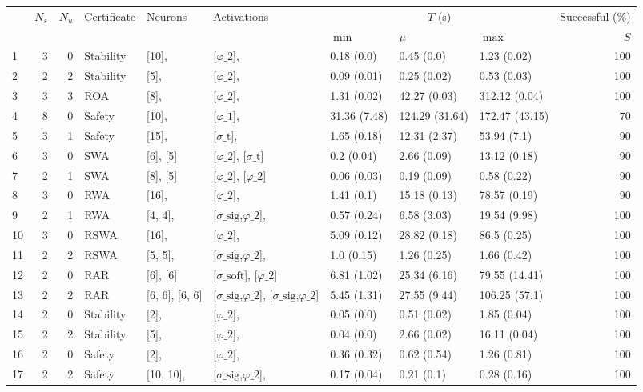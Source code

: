 \begin{tabular}{lrrllllllr}
\toprule
 & $N_s$ & $N_u$ & Certificate & Neurons & Activations & \multicolumn{3}{c}{$T$ (s)} & Successful (\%) \\
 &  &  &  &  &  & $\min$ & $\mu$ & $\max$ & $S$ \\
\midrule
1 & 3 & 0 & Stability & [10],  & [$\varphi\_{2}$],  & 0.18 (0.0) & 0.45 (0.0) & 1.23 (0.02) & 100 \\
2 & 2 & 2 & Stability & [5],  & [$\varphi\_{2}$],  & 0.09 (0.01) & 0.25 (0.02) & 0.53 (0.03) & 100 \\
3 & 3 & 3 & ROA & [8],  & [$\varphi\_{2}$],  & 1.31 (0.02) & 42.27 (0.03) & 312.12 (0.04) & 100 \\
4 & 8 & 0 & Safety & [10],  & [$\varphi\_{1}$],  & 31.36 (7.48) & 124.29 (31.64) & 172.47 (43.15) & 70 \\
5 & 3 & 1 & Safety & [15],  & [$\sigma\_{\mathrm{t}}$],  & 1.65 (0.18) & 12.31 (2.37) & 53.94 (7.1) & 90 \\
6 & 3 & 0 & SWA & [6], [5] & [$\varphi\_{2}$], [$\sigma\_{\mathrm{t}}$] & 0.2 (0.04) & 2.66 (0.09) & 13.12 (0.18) & 90 \\
7 & 2 & 1 & SWA & [8], [5] & [$\varphi\_{2}$], [$\varphi\_{2}$] & 0.06 (0.03) & 0.19 (0.09) & 0.58 (0.22) & 90 \\
8 & 3 & 0 & RWA & [16],  & [$\varphi\_{2}$],  & 1.41 (0.1) & 15.18 (0.13) & 78.57 (0.19) & 90 \\
9 & 2 & 1 & RWA & [4, 4],  & [$\sigma\_{\mathrm{sig}}$,$\varphi\_{2}$],  & 0.57 (0.24) & 6.58 (3.03) & 19.54 (9.98) & 100 \\
10 & 3 & 0 & RSWA & [16],  & [$\varphi\_{2}$],  & 5.09 (0.12) & 28.82 (0.18) & 86.5 (0.25) & 100 \\
11 & 2 & 2 & RSWA & [5, 5],  & [$\sigma\_{\mathrm{sig}}$,$\varphi\_{2}$],  & 1.0 (0.15) & 1.26 (0.25) & 1.66 (0.42) & 100 \\
12 & 2 & 0 & RAR & [6], [6] & [$\sigma\_{\mathrm{soft}}$], [$\varphi\_{2}$] & 6.81 (1.02) & 25.34 (6.16) & 79.55 (14.41) & 100 \\
13 & 2 & 2 & RAR & [6, 6], [6, 6] & [$\sigma\_{\mathrm{sig}}$,$\varphi\_{2}$], [$\sigma\_{\mathrm{sig}}$,$\varphi\_{2}$] & 5.45 (1.31) & 27.55 (9.44) & 106.25 (57.1) & 100 \\
14 & 2 & 0 & Stability & [2],  & [$\varphi\_{2}$],  & 0.05 (0.0) & 0.51 (0.02) & 1.85 (0.04) & 100 \\
15 & 2 & 2 & Stability & [5],  & [$\varphi\_{2}$],  & 0.04 (0.0) & 2.66 (0.02) & 16.11 (0.04) & 100 \\
16 & 2 & 0 & Safety & [2],  & [$\varphi\_{2}$],  & 0.36 (0.32) & 0.62 (0.54) & 1.26 (0.81) & 100 \\
17 & 2 & 2 & Safety & [10, 10],  & [$\sigma\_{\mathrm{sig}}$,$\varphi\_{2}$],  & 0.17 (0.04) & 0.21 (0.1) & 0.28 (0.16) & 100 \\
\bottomrule
\end{tabular}
